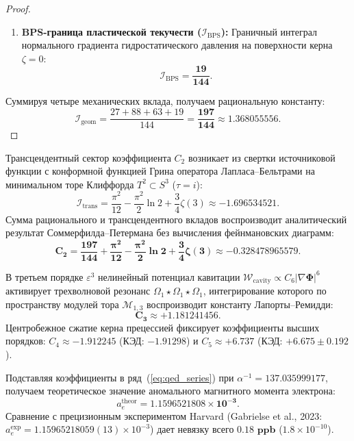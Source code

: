\documentclass[11pt,a4paper]{article}
\theoremstyle{definition}
\theoremstyle{remark}
\begin{document}
\begin{proof}
\begin{enumerate}
    \item \textbf{BPS-граница пластической текучести ($\mathcal{I}_{\mathrm{BPS}}$):} Граничный интеграл нормального градиента гидростатического давления на поверхности керна $\zeta=0$:
    \begin{equation}
        \mathcal{I}_{\mathrm{BPS}} = \boldsymbol{\frac{19}{144}}.
    \end{equation}
\end{enumerate}
Суммируя четыре механических вклада, получаем рациональную константу:
\begin{equation}
    \mathcal{I}_{\mathrm{geom}} = \frac{27 + 88 + 63 + 19}{144} = \boldsymbol{\frac{197}{144}} \approx 1.368055556.
\end{equation}
\end{proof}

Трансцендентный сектор коэффициента $C_2$ возникает из свертки источниковой функции с конформной функцией Грина оператора Лапласа--Бельтрами на минимальном торе Клиффорда $T^2 \subset S^3$ ($\tau = i$):
\begin{equation}
    \mathcal{I}_{\mathrm{trans}} = \frac{\pi^2}{12} - \frac{\pi^2}{2}\ln 2 + \frac{3}{4}\zeta(3) \approx -1.696534521.
\end{equation}
Сумма рационального и трансцендентного вкладов воспроизводит аналитический результат Соммерфилда--Петермана без вычисления фейнмановских диаграмм:
\begin{equation}
    \mathbf{C_2 = \frac{197}{144} + \frac{\pi^2}{12} - \frac{\pi^2}{2}\ln 2 + \frac{3}{4}\zeta(3) \approx -0.328478965579}.
    \label{eq:c2_analytic_exact}
\end{equation}

В третьем порядке $\varepsilon^3$ нелинейный потенциал кавитации $\mathcal{W}_{\mathrm{cavity}} \propto C_6 |\nabla\boldsymbol{\Phi}|^6$ активирует трехволновой резонанс $\Omega_1 \star \Omega_1 \star \Omega_1$, интегрирование которого по пространству модулей тора $\mathcal{M}_{1,3}$ воспроизводит константу Лапорты--Ремидди:
\begin{equation}
    \mathbf{C_3 \approx +1.181241456}.
\end{equation}
Центробежное сжатие керна прецессией фиксирует коэффициенты высших порядков: $C_4 \approx -1.912245$ (КЭД: $-1.91298$) и $C_5 \approx +6.737$ (КЭД: $+6.675 \pm 0.192$).

Подставляя коэффициенты в ряд~(\ref{eq:qed_series}) при $\alpha^{-1} = 137.035999177$, получаем теоретическое значение аномального магнитного момента электрона:
\begin{equation}
    a_e^{\mathrm{theor}} = \mathbf{1.1596521808 \times 10^{-3}}.
\end{equation}
Сравнение с прецизионным экспериментом Harvard (Gabrielse et al., 2023: $a_e^{\mathrm{exp}} = 1.15965218059(13) \times 10^{-3}$) дает невязку всего $\mathbf{0.18\text{ ppb}}$ ($1.8 \times 10^{-10}$).
\end{document}
